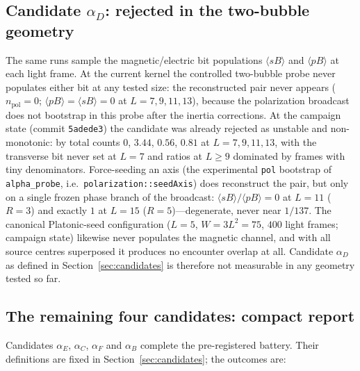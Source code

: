 \documentclass[11pt,a4paper]{article}
\begin{document}
\subsection{Candidate \texorpdfstring{$\alpha_D$}{alphaD}: rejected in the
two-bubble geometry}

The same runs sample the magnetic/electric bit populations $\langle sB\rangle$
and $\langle pB\rangle$ at each light frame.  At the current kernel the
controlled two-bubble probe never populates either bit at any tested size:
the reconstructed pair never appears ($n_{\mathrm{pol}}=0$;
$\langle pB\rangle=\langle sB\rangle=0$ at $L=7,9,11,13$), because the
polarization broadcast does not bootstrap in this probe after the inertia
corrections.  At the campaign state (commit \texttt{5adede3}) the candidate
was already rejected as unstable and non-monotonic: by total counts $0$,
$3.44$, $0.56$, $0.81$ at $L=7,9,11,13$, with the transverse bit never set
at $L=7$ and ratios at $L\ge9$ dominated by frames with tiny denominators.
Force-seeding an axis (the experimental \texttt{pol} bootstrap of
\texttt{alpha\_probe}, i.e.\ \texttt{polarization::seedAxis}) does
reconstruct the pair, but only on a single frozen phase branch of the
broadcast: $\langle sB\rangle/\langle pB\rangle=0$ at $L=11$ ($R=3$) and
exactly $1$ at $L=15$ ($R=5$)---degenerate, never near $1/137$.  The
canonical Platonic-seed configuration ($L=5$, $W=3L^2=75$, $400$ light
frames; campaign state) likewise never populates the magnetic channel, and
with all source centres superposed it produces no encounter overlap at all.
Candidate $\alpha_D$ as defined in Section~\ref{sec:candidates} is therefore
not measurable in any geometry tested so far.



\subsection{The remaining four candidates: compact report}

Candidates $\alpha_E$, $\alpha_C$, $\alpha_F$ and $\alpha_B$ complete the
pre-registered battery. Their definitions are fixed in
Section~\ref{sec:candidates}; the outcomes are:
\end{document}
